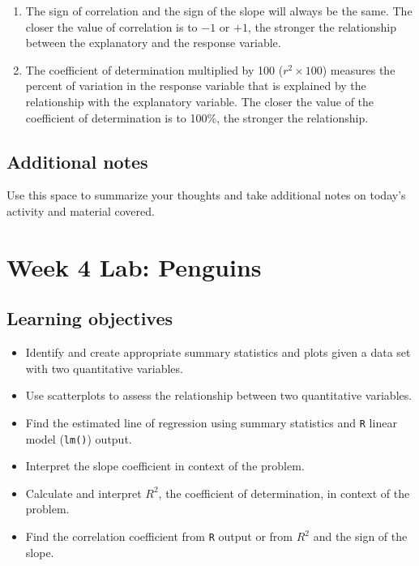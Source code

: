 \documentclass[
]{report}
\begin{document}
\begin{enumerate}
\def\labelenumi{\arabic{enumi}.}
\item
  The sign of correlation and the sign of the slope will always be the same. The closer the value of correlation is to \(-1\) or \(+1\), the stronger the relationship between the explanatory and the response variable.
\item
  The coefficient of determination multiplied by 100 (\(r^2 \times 100\)) measures the percent of variation in the response variable that is explained by the relationship with the explanatory variable. The closer the value of the coefficient of determination is to 100\%, the stronger the relationship.
\end{enumerate}

\hypertarget{additional-notes-6}{%
\subsection{Additional notes}\label{additional-notes-6}}

Use this space to summarize your thoughts and take additional notes on today's activity and material covered.

\newpage

\hypertarget{week-4-lab-penguins}{%
\section{Week 4 Lab: Penguins}\label{week-4-lab-penguins}}


\hypertarget{learning-objectives-5}{%
\subsection{Learning objectives}\label{learning-objectives-5}}

\begin{itemize}
\item
  Identify and create appropriate summary statistics and plots
  given a data set with two quantitative variables.
\item
  Use scatterplots to assess the relationship between two quantitative variables.
\item
  Find the estimated line of regression using summary statistics and \texttt{R} linear model (\texttt{lm()}) output.
\item
  Interpret the slope coefficient in context of the problem.
\item
  Calculate and interpret \(R^2\), the coefficient of determination, in context of the problem.
\item
  Find the correlation coefficient from \texttt{R} output or from \(R^2\) and the sign of the slope.
\end{itemize}
\end{document}
